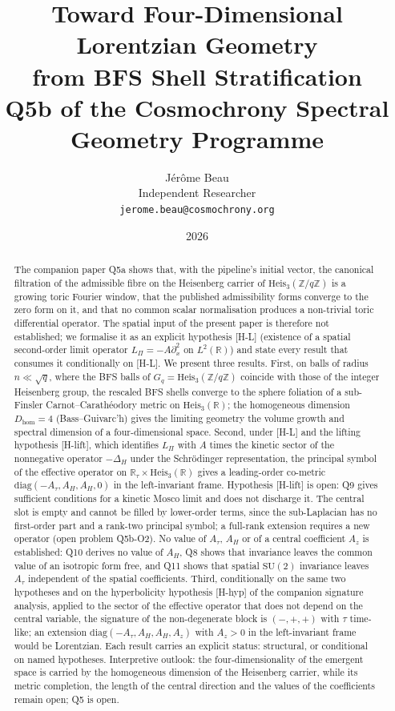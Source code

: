 \documentclass[11pt,a4paper]{article}
\title{Toward Four-Dimensional Lorentzian Geometry\\
from BFS Shell Stratification\\[6pt]
{\large Q5b of the Cosmochrony Spectral Geometry Programme}}
\author{J\'{e}r\^{o}me Beau\\[4pt]
\small Independent Researcher\\
\small \texttt{jerome.beau@cosmochrony.org}}
\date{2026}
\theoremstyle{definition}
\theoremstyle{remark}
\newcommand{\HeisR}{\mathrm{Heis}_3(\mathbb{R})}
\newcommand{\HeisZ}{\mathrm{Heis}_3(\mathbb{Z}/q\mathbb{Z})}
\newcommand{\DeltaH}{\Delta_H}
\newcommand{\LPi}{L_\Pi}
\newcommand{\Gq}{G_q}
\newcommand{\Dhom}{D_{\mathrm{hom}}}
\begin{document}
  \maketitle

  \begin{abstract}
    The companion paper Q5a shows that, with the pipeline's initial vector, the canonical filtration of the admissible
    fibre on the Heisenberg carrier of $\HeisZ$ is a growing toric Fourier window, that the published admissibility
    forms converge to the zero form on it, and that no common scalar normalisation produces a non-trivial toric
    differential operator.
    The spatial input of the present paper is therefore not established; we formalise it as an explicit hypothesis
    [H-L] (existence of a spatial second-order limit operator $\LPi = -A\partial_x^2$ on $L^2(\mathbb{R})$) and state
    every result that consumes it conditionally on [H-L].
    We present three results.
    First, on balls of radius $n \ll \sqrt q$, where the BFS balls of $\Gq = \HeisZ$ coincide with those of the
    integer Heisenberg group, the rescaled BFS shells converge to the sphere foliation of a sub-Finsler
    Carnot--Car\-a\-th\'{e}o\-do\-ry metric on $\HeisR$; the homogeneous dimension $\Dhom = 4$
    (Bass--Guivarc'h) gives the limiting geometry the volume growth and spectral dimension of a four-dimensional
    space.
    Second, under [H-L] and the lifting hypothesis [H-lift], which identifies $\LPi$ with $A$ times the kinetic sector
    of the nonnegative operator $-\DeltaH$ under the Schr\"{o}dinger representation, the principal symbol of the
    effective operator on
    $\mathbb{R}_\tau \times \HeisR$ gives a leading-order co-metric $\mathrm{diag}(-A_\tau, A_H, A_H, 0)$ in the
    left-invariant frame.
    Hypothesis [H-lift] is open: Q9 gives sufficient conditions for a kinetic Mosco limit and does not discharge it.
    The central slot is empty and cannot be filled by lower-order terms, since the sub-Laplacian has no first-order
    part and a rank-two principal symbol; a full-rank extension requires a new operator (open problem Q5b-O2).
    No value of $A_\tau$, $A_H$ or of a central coefficient $A_z$ is established: Q10 derives no value of $A_H$, Q8
    shows that invariance leaves the common value of an isotropic form free, and Q11 shows that spatial $\mathrm{SU}(2)$
    invariance leaves $A_\tau$ independent of the spatial coefficients.
    Third, conditionally on the same two hypotheses and on the hyperbolicity hypothesis [H-hyp] of the companion
    signature analysis, applied to the sector of the effective operator that does not depend on the central
    variable, the signature of the non-degenerate block is $(-,+,+)$ with $\tau$ time-like; an extension
    $\mathrm{diag}(-A_\tau, A_H, A_H, A_z)$ with $A_z > 0$ in the left-invariant frame would be Lorentzian.
    Each result carries an explicit status: structural, or conditional on named hypotheses.
    Interpretive outlook: the four-dimensionality of the emergent space is carried by the homogeneous dimension of
    the Heisenberg carrier, while its metric completion, the length of the central direction and the values of the
    coefficients remain open; Q5 is open.
  \end{abstract}
\end{document}
